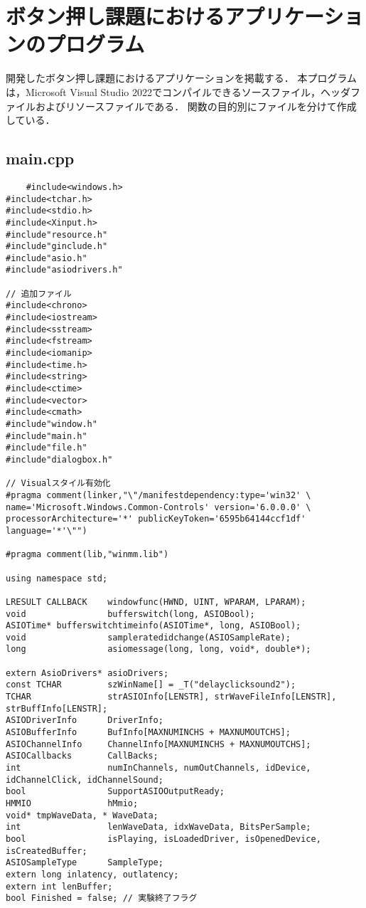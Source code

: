 \chapter{ボタン押し課題におけるアプリケーションのプログラム}
開発したボタン押し課題におけるアプリケーションを掲載する．
本プログラムは，Microsoft Visual Studio 2022でコンパイルできるソースファイル，ヘッダファイルおよびリソースファイルである．
関数の目的別にファイルを分けて作成している．

\section{main.cpp}
\begin{verbatim}
	#include<windows.h>
#include<tchar.h>
#include<stdio.h>
#include<Xinput.h>
#include"resource.h"
#include"ginclude.h"
#include"asio.h"
#include"asiodrivers.h"

// 追加ファイル
#include<chrono>
#include<iostream>
#include<sstream>
#include<fstream>
#include<iomanip>
#include<time.h>
#include<string>
#include<ctime>
#include<vector>
#include<cmath>
#include"window.h"
#include"main.h"
#include"file.h"
#include"dialogbox.h"

// Visualスタイル有効化
#pragma comment(linker,"\"/manifestdependency:type='win32' \
name='Microsoft.Windows.Common-Controls' version='6.0.0.0' \
processorArchitecture='*' publicKeyToken='6595b64144ccf1df' language='*'\"")

#pragma comment(lib,"winmm.lib")

using namespace std;

LRESULT CALLBACK	windowfunc(HWND, UINT, WPARAM, LPARAM);
void				bufferswitch(long, ASIOBool);
ASIOTime* bufferswitchtimeinfo(ASIOTime*, long, ASIOBool);
void				sampleratedidchange(ASIOSampleRate);
long				asiomessage(long, long, void*, double*);

extern AsioDrivers* asioDrivers;
const TCHAR			szWinName[] = _T("delayclicksound2");
TCHAR				strASIOInfo[LENSTR], strWaveFileInfo[LENSTR], strBuffInfo[LENSTR];
ASIODriverInfo		DriverInfo;
ASIOBufferInfo		BufInfo[MAXNUMINCHS + MAXNUMOUTCHS];
ASIOChannelInfo		ChannelInfo[MAXNUMINCHS + MAXNUMOUTCHS];
ASIOCallbacks		CallBacks;
int					numInChannels, numOutChannels, idDevice, idChannelClick, idChannelSound;
bool				SupportASIOOutputReady;
HMMIO				hMmio;
void* tmpWaveData, * WaveData;
int					lenWaveData, idxWaveData, BitsPerSample;
bool				isPlaying, isLoadedDriver, isOpenedDevice, isCreatedBuffer;
ASIOSampleType		SampleType;
extern long inlatency, outlatency;
extern int lenBuffer;
bool Finished = false; // 実験終了フラグ


\end{verbatim}
